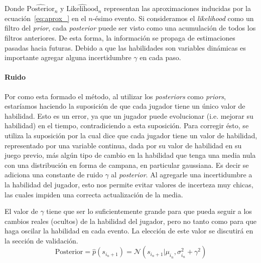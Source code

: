 \documentclass[11pt,twoside,spanish]{report} %
\newcommand{\N}{\mathcal{N}}
\begin{document}
Donde {\footnotesize $\widehat{\text{Posterior}}_n$} y {\footnotesize $\widehat{\text{Likelihood}}_n$} representan las aproximaciones inducidas por la ecuaci\'on~\ref{eq:aprox_} en el $n$-\'esimo evento.
Si consideramos el \textit{likelihood} como un filtro del \textit{prior}, cada \textit{posterior} puede ser visto como una acumulaci\'on de todos los filtros anteriores.
De esta forma, la informaci\'on se propaga de estimaciones pasadas hacia futuras.
Debido a que las habilidades son variables din\'amicas es importante agregar alguna incertidumbre $\gamma$ en cada paso.



\paragraph{Ruido}
Por como esta formado el m\'etodo, al utilizar los \textit{posteriors} como \textit{priors}, estar\'iamos haciendo la suposici\'on de que cada jugador tiene un \'unico valor de habilidad.
Esto es un error, ya que un jugador puede evolucionar (i.e. mejorar su habilidad) en el tiempo, contradiciendo a esta suposici\'on.
Para corregir \'esto, se utiliza la suposici\'on por la cual dice que cada jugador tiene un valor de habilidad, representado por una variable continua, dada por su valor de habilidad en su juego previo, m\'as alg\'un tipo de cambio en la habilidad que tenga una media nula con una distribuci\'on en forma de campana, en particular gaussiana.
Es decir se adiciona una constante de ruido $\gamma$ al \textit{posterior}.
Al agregarle una incertidumbre a la habilidad del jugador, esto nos permite evitar valores de incerteza muy chicas, las cuales impiden una correcta actualizaci\'on de la media.

El valor de  $\gamma$ tiene que ser lo suficientemente grande para que pueda seguir a los cambios reales (ocultos) de la habilidad del jugador, pero no tanto como para que haga oscilar la habilidad en cada evento.
La elecci\'on de este valor se discutir\'a en la secci\'on de validaci\'on.
\begin{equation}
	\text{Posterior}= \widehat{p}(s_{i_n+1}) = \N(s_{i_n+1} | \mu_{i_{n}}, \sigma_{i_{n}}^2 + \gamma^2 )
\end{equation}
\end{document}
